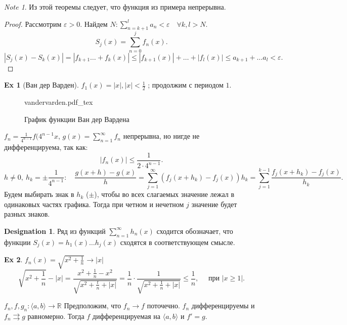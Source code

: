 \documentclass[11pt]{book}
\newcommand{\incfig}[1]{%
    \def\svgwidth{\columnwidth}
    {#1.pdf_tex}
}
\newcommand{\R}{\mathbb{R}}
\newcommand{\slim}{\sum\limits}
\renewcommand{\le}{\leqslant}
\renewcommand{\ge}{\geqslant}
\theoremstyle{definition}
\theoremstyle{plain}
\theoremstyle{plain}
\theoremstyle{definition}
\newtheorem*{ex}{Ex}
\newtheorem*{name}{Designation}
\theoremstyle{remark}
\newtheorem*{note}{Note}
\begin{document}
\begin{note}
    Из этой теоремы следует, что функция из примера непрерывна.
\end{note}
\begin{proof}
    Рассмотрим $ \varepsilon  > 0$. Найдем $N: \slim_{n=k+1}^{l} a_n < \varepsilon  \quad \forall  k, l > N$.
    \[
	S_j(x) = \slim_{n=0}^{j}f_n(x)
    .\]
    \[
	|S_j(x) - S_k(x)| = | f_{k+1} \ldots + f_k(x)| \le  |f_{k+1}(x)| + \ldots  + |f_l(x)| \le a_{k+1} + \ldots a_l < \varepsilon
    .\]
\end{proof}
\begin{ex}[Ван дер Варден]
    $f_1(x) =
    |x|,  |x| < \frac{1}{2} $ ; продолжим с периодом $1$.
    \begin{figure}[h]
	\centering
	\incfig{vandervarden}
	\caption{График функции Ван дер Вардена}
	\label{fig:vandervarden}
    \end{figure}
    $f_n = \frac{1}{4^{n-1}}f(4^{n-1}x$, $g(x) = \slim_{n=1}^{\infty} f_n$ непрерывна, но нигде не дифференцируема, так как:
    \[
	|f_n(x) | \le \frac{1}{2 \cdot 4^{n-1}}
    .\]
    \[
	h \ne 0, ~ h_k = \pm \frac{1}{4^{n-1}}: \quad \frac{g(x + h) - g(x)}{h} = \slim_{j=1}^{\infty} (f_j(x + h_k) - f_j(x))h_k = \slim_{j=1}^{k-1} \frac{f_j(x + h_k) - f_j(x)}{h_k}
    .\]
    Будем выбирать знак  в $h_k$ ($\pm$), чтобы во всех слагаемых значение лежал в одинаковых частях графика. Тогда при четном и нечетном $j$ значение будет разных знаков.
\end{ex}
\begin{name}
    Ряд из функций $\slim_{n=1}^{\infty} h_n(x)$ сходится обозначает, что функции $S_j(x) = h_1(x) \ldots  h_j(x)$  сходятся в соответствующем смысле.
\end{name}
\begin{ex}
    $f_n(x) = \sqrt{x^2 + \frac{1}{n}} \to  |x|$
    \[
	\sqrt{x^2 + \frac{1}{n} }- |x| = \frac{x^2 + \frac{1}{n}  - x^2}{\sqrt{x^2 + \frac{t}{n} + |x|}} = \frac{1}{n }\cdot \frac{1}{\sqrt{x ^2 + \frac{1}{n} + |x|}} \le  \frac{1}{n}, \quad \text{ при } |x \ge  1|
    .\]
\end{ex}
\begin{thm}
    $f_n, f, g_n : \langle a, b \rangle  \to  \R$ Предположим, что $f_n \to  f$ поточечно.
    $f_n$ дифференцируемы и $f_n \rightrightarrows g$ равномерно. Тогда $f$  дифференцируемая на $\langle a, b \rangle$ и $f '= g$.
\end{thm}
\end{document}
